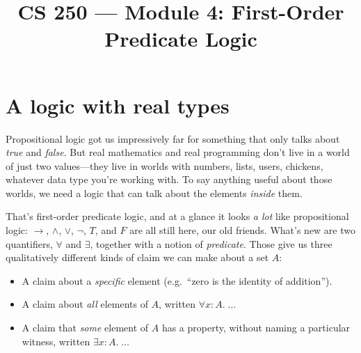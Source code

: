 \documentclass[11pt]{article}
\title{CS 250 --- Module 4: First-Order Predicate Logic}
\author{}
\date{}
\begin{document}
\maketitle

\begin{readingmap}



\end{readingmap}

\section{A logic with real types}
Propositional logic got us impressively far for something that only talks about \emph{true} and \emph{false}. But real mathematics and real programming don't live in a world of just two values---they live in worlds with numbers, lists, users, chickens, whatever data type you're working with. To say anything useful about those worlds, we need a logic that can talk about the elements \emph{inside} them.

That's first-order predicate logic, and at a glance it looks \emph{a lot} like propositional logic: $\to$, $\wedge$, $\vee$, $\lnot$, $T$, and $F$ are all still here, our old friends. What's new are two quantifiers, $\forall$ and $\exists$, together with a notion of \emph{predicate}. Those give us three qualitatively different kinds of claim we can make about a set $A$:
\begin{itemize}
  \item A claim about a \emph{specific} element (e.g.\ ``zero is the identity of addition'').
  \item A claim about \emph{all} elements of $A$, written $\forall x : A.\; \ldots$
  \item A claim that \emph{some} element of $A$ has a property, without naming a particular witness, written $\exists x : A.\; \ldots$
\end{itemize}
\end{document}
